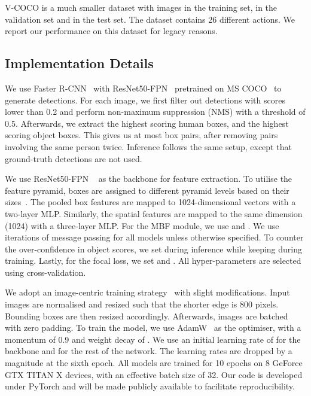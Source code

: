 \documentclass[10pt,twocolumn,letterpaper]{article}
\begin{document}
V-COCO is a much smaller dataset with  images in the training set,  in the validation set and  in the test set. The dataset contains 26 different actions. We report our performance on this dataset for legacy reasons.

\subsection{Implementation Details}

We use Faster R-CNN~\cite{ren2015} with ResNet50-FPN~\cite{he2016, lin2017} pretrained on MS COCO~\cite{lin2014} to generate detections. For each image, we first filter out detections with scores lower than 0.2 and perform non-maximum suppression (NMS) with a threshold of 0.5. Afterwards, we extract the  highest scoring human boxes, and the  highest scoring object boxes. This gives us at most  box pairs, after removing pairs involving the same person twice. Inference follows the same setup, except that ground-truth detections are not used.

We use ResNet50-FPN ~\cite{he2016, lin2017} as the backbone for feature extraction. To utilise the feature pyramid, boxes are assigned to different pyramid levels based on their sizes~\cite{lin2017}. The pooled box features are mapped to 1024-dimensional vectors with a two-layer MLP. Similarly, the spatial features are mapped to the same dimension (1024) with a three-layer MLP. For the MBF module, we use  and . We use  iterations of message passing for all models unless otherwise specified. To counter the over-confidence in object scores, we set  during inference while keeping  during training. Lastly, for the focal loss, we set  and . All hyper-parameters are selected using cross-validation.

We adopt an image-centric training strategy~\cite{girshick2015} with slight modifications. Input images are normalised and resized such that the shorter edge is 800 pixels. Bounding boxes are then resized accordingly. Afterwards, images are batched with zero padding. To train the model, we use AdamW~\cite{ilya2018} as the optimiser, with a momentum of 0.9 and weight decay of . We use an initial learning rate of  for the backbone and  for the rest of the network. The learning rates are dropped by a magnitude at the sixth epoch. All models are trained for 10 epochs on 8 GeForce GTX TITAN X devices, with an effective batch size of 32.
Our code is developed under PyTorch and will be made publicly available to facilitate reproducibility.
\end{document}
